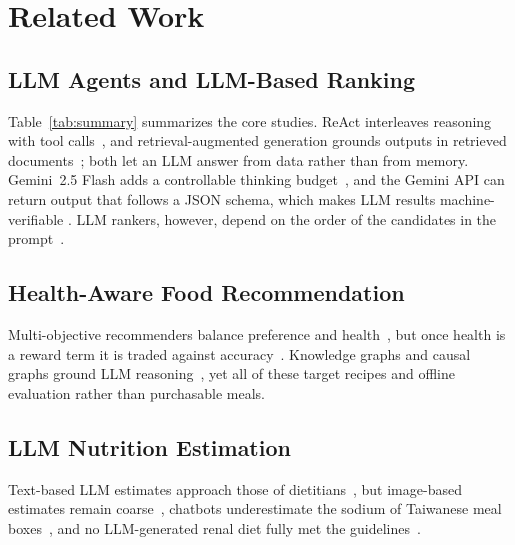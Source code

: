 \section{Related Work}
\label{sec:related_work}

\subsection{LLM Agents and LLM-Based Ranking}
Table~\ref{tab:summary} summarizes the core studies. ReAct interleaves reasoning with tool calls~\cite{yao2023react}, and
retrieval-augmented generation grounds outputs in retrieved
documents~\cite{lewis2020rag}; both let an LLM answer from data rather than
from memory. Gemini~2.5 Flash adds a controllable thinking
budget~\cite{gemini2025report}, and the Gemini API can return output that
follows a JSON schema, which makes LLM results machine-verifiable
\cite{google2026structured}. LLM rankers, however, depend on the order of the
candidates in the prompt~\cite{hou2024llmrank}.



\subsection{Health-Aware Food Recommendation}
Multi-objective recommenders balance preference and
health~\cite{zhang2025mopihfrs}, but once health is a reward term it is traded
against accuracy~\cite{vasantlal2026morla2c}. Knowledge graphs and causal graphs
ground LLM reasoning~\cite{mohbat2025kerl,yang2025causalgraph}, yet all of these
target recipes and offline evaluation rather than purchasable meals.

\subsection{LLM Nutrition Estimation}
Text-based LLM estimates approach those of
dietitians~\cite{dhaliwal2025nutribench}, but image-based estimates remain
coarse~\cite{bhatambarekar2025multimodal}, chatbots underestimate the sodium of
Taiwanese meal boxes~\cite{hsuan2025mealbox}, and no LLM-generated renal diet
fully met the guidelines~\cite{aydincil2026renal}.

